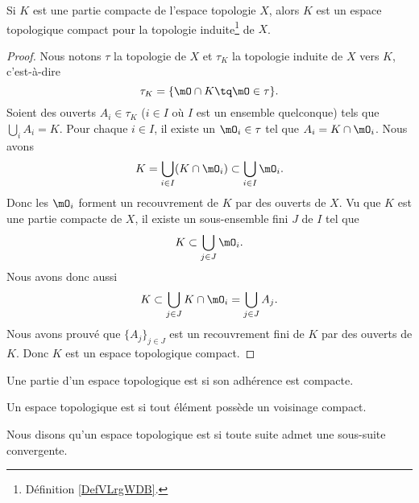 \begin{lemma}       \label{LEMooVYTRooKTIYdn}
    Si \( K\) est une partie compacte de l'espace topologie \( X\), alors \( K\) est un espace topologique compact pour la topologie induite\footnote{Définition \ref{DefVLrgWDB}.} de \( X\).
\end{lemma}

\begin{proof}
    Nous notons \( \tau\) la topologie de \( X\) et \( \tau_K\) la topologie induite de \( X\) vers \( K\), c'est-à-dire
    \begin{equation}
        \tau_K=\{ \mO\cap K\tq \mO\in\tau \}.
    \end{equation}
    Soient des ouverts \( A_i\in \tau_K\) (\( i\in I\) où \( I\) est un ensemble quelconque) tels que \( \bigcup_iA_i=K\). Pour chaque \( i\in I\), il existe un \( \mO_i\in \tau\) tel que \( A_i=K\cap\mO_i\). Nous avons
    \begin{equation}
        K=\bigcup_{i\in I}(K\cap\mO_i)\subset\bigcup_{i\in I}\mO_i.
    \end{equation}
    Donc les \( \mO_i\) forment un recouvrement de \( K\) par des ouverts de \( X\). Vu que \( K\) est une partie compacte de \( X\), il existe un sous-ensemble fini \( J\) de \( I\) tel que
    \begin{equation}
        K\subset\bigcup_{j\in J}\mO_i.
    \end{equation}
    Nous avons donc aussi
    \begin{equation}
        K\subset\bigcup_{j\in J}K\cap\mO_i=\bigcup_{j\in J}A_j.
    \end{equation}
    Nous avons prouvé que \( \{ A_j \}_{j\in J}\) est un recouvrement fini de \( K\) par des ouverts de \( K\). Donc \( K\) est un espace topologique compact.
\end{proof}

\begin{definition}
    Une partie d'un espace topologique est  si son adhérence est compacte.
\end{definition}

\begin{definition}  \label{DefEIBYooAWoESf}
    Un espace topologique est  si tout élément possède un voisinage compact.
\end{definition}

\begin{definition}
    Nous disons qu'un espace topologique est  si toute suite admet une sous-suite convergente.
\end{definition}

